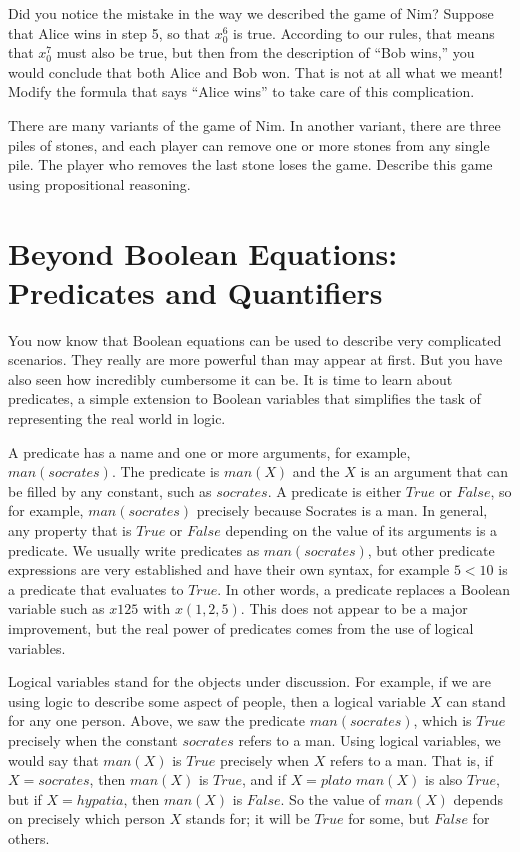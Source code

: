 \begin{ExerciseList}
\Exercise
Did you notice the mistake in the way we described the game of Nim? Suppose that Alice wins in step 5, so that $x_{0}^{6}$ is
true. According to our rules, that means that $x_{0}^{7}$ must also be true, but then from the description of ``Bob wins,''
you would conclude that both Alice and Bob won. That is not at all what we meant! Modify the formula that says ``Alice wins''
to take care of this complication.

\Exercise 
There are many variants of the game of Nim. In another variant, there are three piles of stones, and each player can remove
one or more stones from any single pile. The player who removes the last stone loses the game. Describe this game using
propositional reasoning.

\end{ExerciseList}

\section{Beyond Boolean Equations: Predicates and Quantifiers}

You now know that Boolean equations can be used to describe very complicated scenarios. They really are more powerful 
than may appear at first. But you have also seen how incredibly cumbersome it can be. It is time to learn about predicates, 
a simple extension to Boolean variables that simplifies the task of representing the real world in logic.

A predicate has a name and one or more arguments, for example, $man(socrates)$. 
The predicate is $man(X)$ and the $X$ is an argument that can be filled by any constant, 
such as $socrates$. A predicate is either $True$ or $False$, so for example, $man(socrates)$
precisely because Socrates is a man. In general, any property that is $True$ or $False$
depending on the value of its arguments is a predicate. We usually write predicates as
$man(socrates)$, but other predicate expressions are very established and have their 
own syntax, for example $5 < 10$ is a predicate that evaluates to $True$.
In other words, a predicate replaces a Boolean variable 
such as $x125$ with $x(1,2,5)$. This does not appear to be a major improvement, but the real power of predicates comes from 
the use of logical variables.

Logical variables stand for the objects under discussion. For example, if we are using logic to describe some aspect of
people, then a logical variable $X$ can stand for any one person. Above, we saw the predicate $man(socrates)$, which is $True$
precisely when the constant $socrates$ refers to a man. Using logical variables, we would say that $man(X)$ is $True$ precisely
when $X$ refers to a man. That is, if $X=socrates$, then $man(X)$ is $True$, and if $X=plato$ $man(X)$ is also $True$, but if
$X=hypatia$, then $man(X)$ is $False$. So the value of $man(X)$ depends on precisely which person $X$ stands for; it will be
$True$ for some, but $False$ for others.

